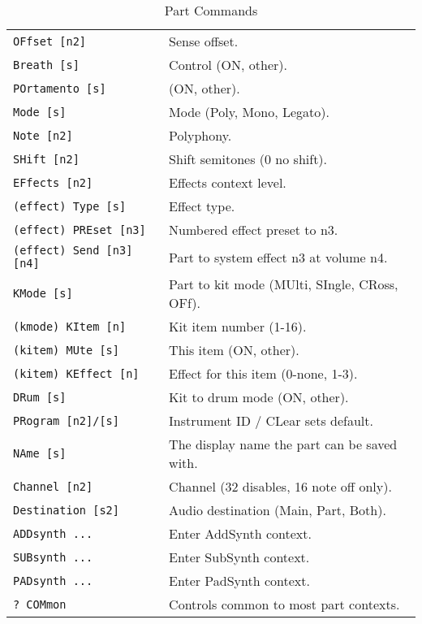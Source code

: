    \begin{table}[H]
      \centering
      \caption{Part Commands}
      \label{table:yoshimi_part_commands}
      \begin{tabular}{l l}

\texttt{OFfset [n2]} &
   Sense offset.  \\
\texttt{Breath [s]} &
   Control (ON, {other}).  \\
\texttt{POrtamento [s]} &
   (ON, other).   \\
\texttt{Mode [s]} &
   Mode (Poly, Mono, Legato). \\
\texttt{Note [n2]} &
   Polyphony.  \\
\texttt{SHift [n2]} &
   Shift semitones (0 no shift). \\
\texttt{EFfects [n2]} &
   Effects context level.  \\
 \texttt{(effect) Type [s]} &
   Effect type.   \\
 \texttt{(effect) PREset [n3]} &
   Numbered effect preset to n3. \\
 \texttt{(effect) Send [n3] [n4]} &
   Part to system effect n3 at volume n4. \\
\texttt{KMode [s]} &
   Part to kit mode (MUlti, SIngle, CRoss, OFf).   \\
 \texttt{(kmode) KItem [n]} &
   Kit item number (1-16). \\
   \texttt{(kitem) MUte [s]} &
      This item (ON, {other}).   \\
   \texttt{(kitem) KEffect [n]} &
      Effect for this item (0-none, 1-3). \\
 \texttt{DRum [s]} &
   Kit to drum mode (ON, {other}).  \\
\texttt{PRogram [n2]/[s]} &
   Instrument ID / CLear sets default. \\
\texttt{NAme [s]} &
   The display name the part can be saved with. \\
\texttt{Channel [n2]} &
   Channel (32 disables, 16 note off only).   \\
\texttt{Destination [s2]} &
   Audio destination (Main, Part, Both).  \\
\texttt{ADDsynth ...} &
   Enter AddSynth context. \\
\texttt{SUBsynth ...} &
   Enter SubSynth context. \\
\texttt{PADsynth ...} &
   Enter PadSynth context. \\
\texttt{? COMmon} &
   Controls common to most part contexts. \\

      \end{tabular}
   \end{table}

